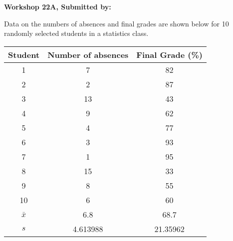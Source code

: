 \documentclass[11pt]{book}\usepackage[]{graphicx}\usepackage[]{color}
\begin{document}
\begin{exercises}
\clearpage

    \begin{exercise}  %

    \begin{center}
\begin{flushleft}\textbf{\large \hfill Workshop 22A, Submitted by: }\end{flushleft}

\end{center}

Data on the numbers of absences and final grades are shown below for 10 randomly selected students in a statistics class.
\begin{center}
\begin{tabular}{@{} ccc @{}} \hline
Student &	Number of absences &	Final Grade (\%) \\ \hline
1&	7&	82 \\
2&	2&	87 \\
3&	13&	43 \\
4&	9&	62 \\
5&	4&	77 \\
6&	3&	93 \\
7&	1&	95 \\
8&	15&	33 \\
9&	8&	55 \\
10&	6&	60 \\ \hline
$\bar{x}$ & 6.8 & 68.7 \\
$s$ & 4.613988 & 21.35962 \\ \hline
\end{tabular}
\end{center}


\end{exercise}
\end{exercises}
\end{document}
